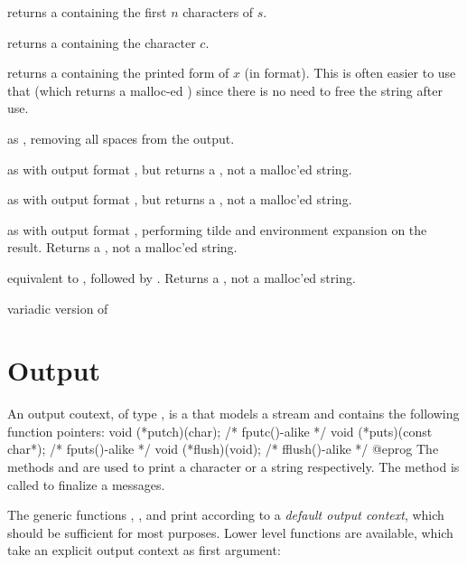 returns a  containing the first $n$ characters of $s$.

 returns a  containing the character
$c$.

 returns a  containing the printed
form of $x$ (in  format). This is often easier to use that
 (which returns a malloc-ed ) since there is no need
to free the string after use.

 as , removing all
spaces from the output.

 as  with output format ,
but returns a , not a malloc'ed string.

 as  with output format ,
but returns a , not a malloc'ed string.

 as  with output format ,
performing tilde and environment expansion on the result. Returns a
, not a malloc'ed string.

 equivalent to
, followed by . Returns a ,
not a malloc'ed string.

 variadic version of

\section{Output}


An output coutext, of type , is a 
that models a stream and contains the following function pointers:
\bprog
void (*putch)(char);           /* fputc()-alike */
void (*puts)(const char*);     /* fputs()-alike */
void (*flush)(void);           /* fflush()-alike */
@eprog\noindent
The methods  and  are used to print a character
or a string respectively.  The method  is called to finalize a
messages.

The generic functions , ,  and
 print according to a \emph{default output context}, which
should be sufficient for most purposes. Lower level functions are available,
which take an explicit output context as first argument:

